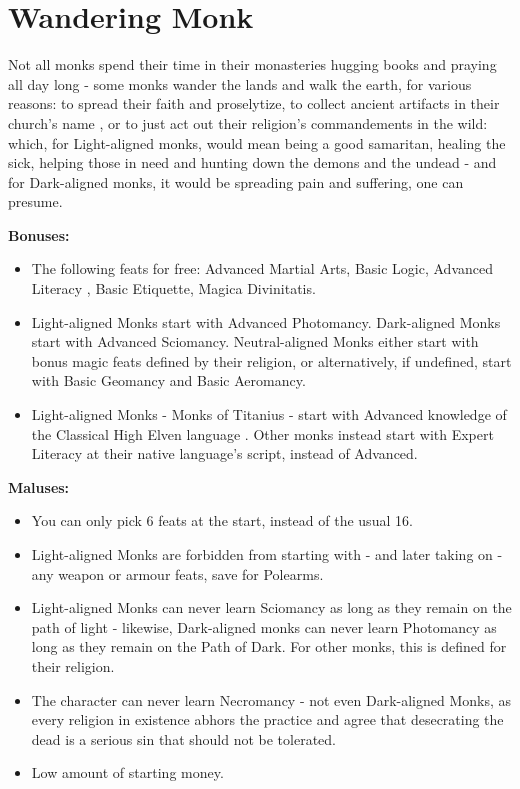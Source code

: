 \section{Wandering Monk}
Not all monks spend their time in their monasteries hugging books and praying all day long - some monks wander the lands and walk the earth, for various reasons: to spread their faith and proselytize, to collect ancient artifacts in their church's name , or to just act out their religion's commandements in the wild: which, for Light-aligned monks, would mean being a good samaritan, healing the sick, helping those in need and hunting down the demons and the undead - and for Dark-aligned monks, it would be spreading pain and suffering, one can presume. 


\textbf{Bonuses:}
\begin{itemize}
	\item The following feats for free: Advanced Martial Arts, Basic Logic, Advanced Literacy , Basic Etiquette, Magica Divinitatis.
	\item Light-aligned Monks start with Advanced Photomancy. Dark-aligned Monks start with Advanced Sciomancy. Neutral-aligned Monks either start with bonus magic feats defined by their religion, or alternatively, if undefined, start with Basic Geomancy and Basic Aeromancy.
	\item Light-aligned Monks - Monks of Titanius - start with Advanced knowledge of the Classical High Elven language . Other monks instead start with Expert Literacy at their native language's script, instead of Advanced.
\end{itemize}
\textbf{Maluses:}
\begin{itemize}
	\item You can only pick 6 feats at the start, instead of the usual 16.
	\item Light-aligned Monks are forbidden from starting with - and later taking on - any weapon or armour feats, save for Polearms.
	\item Light-aligned Monks can never learn Sciomancy as long as they remain on the path of light - likewise, Dark-aligned monks can never learn Photomancy as long as they remain on the Path of Dark. For other monks, this is defined for their religion.
	\item The character can never learn Necromancy - not even Dark-aligned Monks, as every religion in existence  abhors the practice and agree that desecrating the dead is a serious sin that should not be tolerated.
	\item Low amount of starting money.
\end{itemize}
